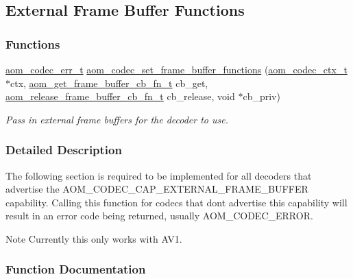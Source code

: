 \hypertarget{group__cap__external__frame__buffer}{}\subsection{External Frame Buffer Functions}
\label{group__cap__external__frame__buffer}
\subsubsection*{Functions}
\begin{DoxyCompactItemize}
\item 
\hyperlink{group__codec_gaaae61e0f8663e6137f1e228757248e7c}{aom\+\_\+codec\+\_\+err\+\_\+t} \hyperlink{group__cap__external__frame__buffer_ga1818a812e4d1e70eeafbe5b0ee538d6e}{aom\+\_\+codec\+\_\+set\+\_\+frame\+\_\+buffer\+\_\+functions} (\hyperlink{group__codec_ga9a1d27f9742d9f70783e3c6cb849b5b4}{aom\+\_\+codec\+\_\+ctx\+\_\+t} $\ast$ctx, \hyperlink{aom__frame__buffer_8h_a01fdfbbc9be8b320437a49d3de07814d}{aom\+\_\+get\+\_\+frame\+\_\+buffer\+\_\+cb\+\_\+fn\+\_\+t} cb\+\_\+get, \hyperlink{aom__frame__buffer_8h_a1803cd0766dc297d88172f174fbb6ab5}{aom\+\_\+release\+\_\+frame\+\_\+buffer\+\_\+cb\+\_\+fn\+\_\+t} cb\+\_\+release, void $\ast$cb\+\_\+priv)
\begin{DoxyCompactList}\small\item\em Pass in external frame buffers for the decoder to use. \end{DoxyCompactList}\end{DoxyCompactItemize}


\subsubsection{Detailed Description}
The following section is required to be implemented for all decoders that advertise the A\+O\+M\+\_\+\+C\+O\+D\+E\+C\+\_\+\+C\+A\+P\+\_\+\+E\+X\+T\+E\+R\+N\+A\+L\+\_\+\+F\+R\+A\+M\+E\+\_\+\+B\+U\+F\+F\+ER capability. Calling this function for codecs that don\textquotesingle{}t advertise this capability will result in an error code being returned, usually A\+O\+M\+\_\+\+C\+O\+D\+E\+C\+\_\+\+E\+R\+R\+OR.

\begin{DoxyNote}{Note}
Currently this only works with A\+V1. 
\end{DoxyNote}


\subsubsection{Function Documentation}
\mbox{\label{group__cap__external__frame__buffer_ga1818a812e4d1e70eeafbe5b0ee538d6e}} 
